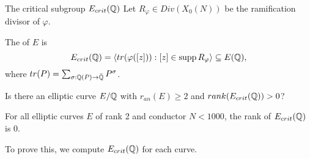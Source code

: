 \documentclass[handout]{beamer}
\begin{document}
\begin{frame}{The critical subgroup $E_{crit}(\mathbb{Q})$}
Let $R_\varphi \in Div(X_0(N))$ be the ramification divisor of $\varphi$.

\begin{Def}
The  of $E$ is
\[
	E_{crit}(\mathbb{Q})  = \langle tr(\varphi([z])) : [z] \in \operatorname{supp} R_\varphi \rangle \subseteq E(\mathbb{Q}), 
\] 
where $tr(P) = \sum_{\sigma: \mathbb{Q}(P) \to \bar{\mathbb{Q}}} P^{\sigma}$.
\end{Def}

\pause


\begin{question}
Is there an elliptic curve $E/\mathbb{Q}$ with $r_{an}(E) \geq 2$ and $rank(E_{crit}(\mathbb{Q})) >0$?
\end{question}
\end{frame}


\begin{frame}

\begin{theorem}[C.]
For all elliptic curves $E$ of rank 2 and conductor $N <1000$, the rank of $E_{crit}(\mathbb{Q})$ is 0.
\end{theorem}

To prove this, we compute $E_{crit}(\mathbb{Q})$ for each curve. 


\end{frame}

\end{document}
